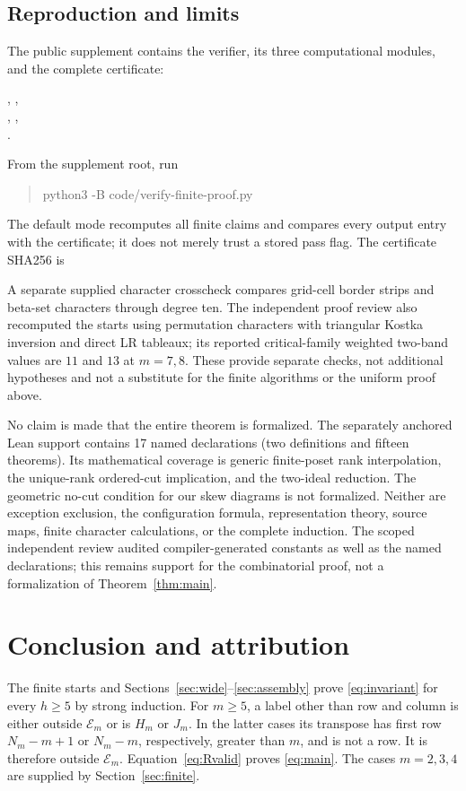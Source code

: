 \documentclass[11pt]{article}
\theoremstyle{remark}\newtheorem{remark}[theorem]{Remark}
\numberwithin{equation}{section}\setlength{\emergencystretch}{2em}
\begin{document}
\subsection{Reproduction and limits}
The public supplement contains the verifier, its three computational
modules, and the complete certificate:
\begin{flushleft}\small
{}, ,\\
, ,\\
.
\end{flushleft}
From the supplement root, run
\begin{quote}\ttfamily\small
python3 -B code/verify-finite-proof.py
\end{quote}
The default mode recomputes all finite claims and compares every output
entry with the certificate; it does not merely trust a stored pass flag.
The certificate SHA256 is
\begin{center}\small\ttfamily

\end{center}
A separate supplied character crosscheck compares grid-cell border strips
and beta-set characters through degree ten. The independent proof review
also recomputed the starts using permutation characters with triangular
Kostka inversion and direct LR tableaux; its reported critical-family
weighted two-band values are $11$ and $13$ at $m=7,8$. These provide
separate checks, not additional hypotheses and not a substitute for the
finite algorithms or the uniform proof above.

No claim is made that the entire theorem is formalized. The separately
anchored Lean support \cite{formal} contains 17 named declarations
(two definitions and fifteen theorems). Its mathematical coverage is generic
finite-poset rank interpolation, the unique-rank ordered-cut implication,
and the two-ideal reduction. The geometric no-cut condition for our skew
diagrams is not formalized. Neither are exception exclusion, the
configuration formula, representation theory, source maps, finite character
calculations, or the complete induction. The scoped independent review
audited compiler-generated constants as well as the named declarations;
this remains support for the combinatorial proof, not a formalization
of Theorem~\ref{thm:main}.

\section{Conclusion and attribution}\label{sec:end}
The finite starts and Sections~\ref{sec:wide}--\ref{sec:assembly} prove
\eqref{eq:invariant} for every $h\ge5$ by strong induction.
For $m\ge5$, a label other than row and column is either outside
$\mathcal E_m$ or is $H_m$ or $J_m$. In the latter cases its transpose
has first row $N_m-m+1$ or $N_m-m$, respectively, greater than $m$,
and is not a row. It is therefore outside $\mathcal E_m$.
Equation~\eqref{eq:Rvalid} proves \eqref{eq:main}. The cases $m=2,3,4$
are supplied by Section~\ref{sec:finite}.
\end{document}
